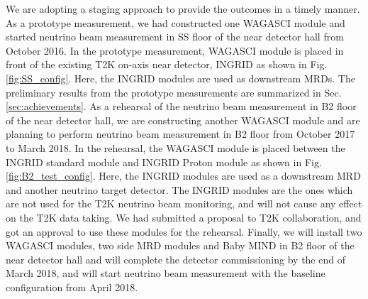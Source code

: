 We are adopting a staging approach to provide the outcomes in a timely manner.
As a prototype measurement, we had constructed one WAGASCI module and started neutrino beam measurement in SS floor of the near detector hall from October 2016.
In the prototype measurement, WAGASCI module is placed in front of the existing T2K on-axis near detector, INGRID as shown in Fig. \ref{fig:SS_config}.
Here, the INGRID modules are used as downstream MRDs.
The preliminary results from the prototype measurements are summarized in Sec. \ref{sec:achievements}.
As a rehearsal of the neutrino beam measurement in B2 floor of the near detector hall,
we are constructing another WAGASCI module and are planning to perform neutrino beam measurement in B2 floor from October 2017 to March 2018.
In the rehearsal, the WAGASCI module is placed between the INGRID standard module and INGRID Proton module as shown in Fig. \ref{fig:B2_test_config}.
Here, the INGRID modules are used as a downstream MRD and another neutrino target detector.
The INGRID modules are the ones which are not used for the T2K neutrino beam monitoring,
and will not cause any effect on the T2K data taking.
We had submitted a proposal to T2K collaboration, and got an approval to use these modules for the rehearsal.
Finally, we will install two WAGASCI modules, two side MRD modules and Baby MIND in B2 floor of the near detector hall and will complete the detector commissioning by the end of March 2018, and will start neutrino beam measurement with the baseline configuration from April 2018.
